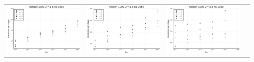 \documentclass{article}
\begin{document}
\begin{landscape}
\begin{center}
\begin{longtable}{| c | c | c | c |}
\includegraphics[height=0.22\textheight]{itepst_fixlim_netgen-1000-2-_-a-b-ns-0330.png} &
\includegraphics[height=0.22\textheight]{itepst_fixlim_netgen-1000-2-_-a-b-ns-0660.png} &
\includegraphics[height=0.22\textheight]{itepst_fixlim_netgen-1000-2-_-a-b-ns-1000.png} \\

\end{longtable}
\end{center}
\end{landscape}
\end{document}

